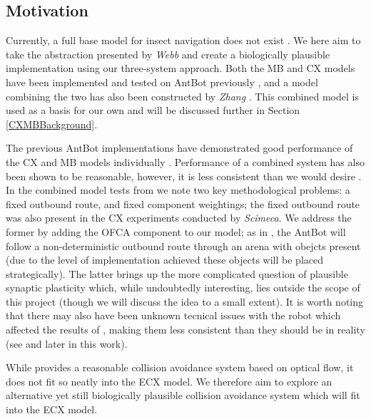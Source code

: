 \documentclass[a4paper,11pt,twoside,openright]{article}
\begin{document}
\subsection{ Motivation }
Currently, a full base model for insect navigation does not exist
\cite{Webb2019}. We here aim to take the abstraction presented by
\textit{Webb} and create a biologically plausible implementation using
our three-system approach. Both the MB and CX models have been
implemented and tested on AntBot previously \cite{Scimeca2017,
  Mitchell2018, Eberding2016, Zhang2017}, and a model combining the
two has also been constructed by \textit{Zhang} \cite{Zhang2017}.
This combined model is used as a basis for our own and will be
discussed further in Section \ref{CXMBBackground}.
\newline
\par

The previous AntBot implementations have demonstrated good performance
of the CX and MB models individually \cite{Scimeca2017,
  Mitchell2018}. Performance of a combined system has also been shown
to be reasonable, however, it is less consistent than we would desire
\cite{Zhang2017}. In the combined model tests from \cite{Zhang2017} we
note two key methodological problems: a fixed outbound route, and
fixed component weightings; the fixed outbound route was also present
in the CX experiments conducted by \textit{Scimeca}. We address the
former by adding the OFCA component to our model; as in
\cite{Mitchell2018}, the AntBot will follow a non-deterministic
outbound route through an arena with obejcts present (due to the level
of implementation achieved these objects will be placed
strategically). The latter brings up the more complicated question of
plausible synaptic plasticity which, while undoubtedly interesting,
lies outside the scope of this project (though we will discuss the
idea to a small extent). It is worth noting that there may also have
been unknown tecnical issues with the robot which affected the results
of \cite{Zhang2017}, making them less consistent than they should be
in reality (see \cite{Mitchell2018} and later in this work).
\newline
\par

While \cite{Mitchell2018} provides a reasonable collision avoidance system
based on optical flow, it does not fit so neatly into the ECX model. We therefore
aim to explore an alternative yet still biologically plausible collision
avoidance system which will fit into the ECX model.
\newline
\par
\end{document}
